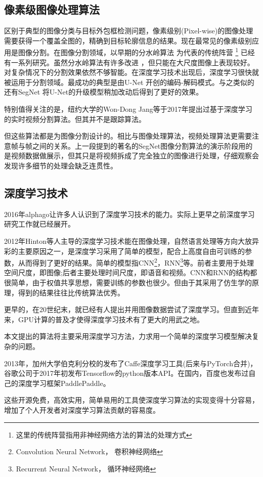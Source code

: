 \subsection{像素级图像处理算法}
区别于典型的图像分类与目标外包框检测问题，像素级别(Pixel-wise)的图像处理需要获得一个覆盖全图的，精确到目标轮廓信息的结果。现在最常见的像素级别应用是图像分割。在图像分割领域，以早期的分水岭算法
\supercite{olsen1997multi}
为代表的传统阵营
\footnote{这里的传统阵营指用非神经网络方法的算法的处理方式}
已经有一系列研究。虽然分水岭算法有许多改进
\supercite{grau2004improved}
，但只能在大尺度图像上表现较好。对复杂情况下的分割效果依然不够智能。在深度学习技术出现后，深度学习很快就被运用于分割领域。最成功的典型是由U-Net
\supercite{ronneberger2015u}
开创的编码-解码模式。与之类似的还有SegNet
\supercite{badrinarayanan2017segnet}
将U-Net的升级模型稍加改动后得到了更好的效果。
\par
特别值得关注的是，纽约大学的Won-Dong Jang等于2017年提出过基于深度学习的实时视频分割算法\supercite{jang2017online}。但其并不是跟踪算法。
\par
但这些算法都是为图像分割设计的。相比与图像处理算法，视频处理算法更需要注意帧与帧之间的关系。上一段提到的著名的SegNet图像分割算法的演示阶段用的是视频数据做展示，但其只是将视频拆成了完全独立的图像进行处理，仔细观察会发现许多细节的处理会缺乏连贯性。

\subsection{深度学习技术}
2016年alphago\supercite{wang2016does}让许多人认识到了深度学习技术的能力。实际上更早之前深度学习研究工作就已经展开。
\par
2012年Hinton等人主导的深度学习技术能在图像处理，自然语言处理等方向大放异彩的主要原因之一，是深度学习采用了简单的模型，配合上高度自由可训练的参数，从而得到了更好的结果。简单的模型指CNN\footnote{Convolution Neural Network， 卷积神经网络}，RNN\footnote{Recurrent Neural Network， 循环神经网络}等。前者主要用于处理空间尺度，即图像;后者主要处理时间尺度，即语音和视频。CNN和RNN的结构都很简单，由于权值共享思想，需要训练的参数也很少。但由于其采用了仿生学的原理，得到的结果往往比传统算法优秀。
\par
更早的，在20世纪末，就已经有人提出并用图像数据尝试了深度学习\supercite{lecun1998gradient}。但直到近年来，GPU计算的普及才使得深度学习技术有了更大的用武之地。
\par
本文提出的算法将主要采用深度学习方法，力求用一个简单的深度学习模型解决复杂的问题。

\par
2013年，加州大学伯克利分校的发布了Caffe\supercite{jia2014caffe}深度学习工具(后来与PyTorch\supercite{paszke2017automatic}合并)，谷歌公司于2017年初发布Tensorflow\supercite{abadi2016tensorflow}的python版本API。在国内，百度也发布过自己的深度学习框架PaddlePaddle\supercite{recognize_digits_paddle}。
\par
这些开源免费，高效实用，简单易用的工具使深度学习算法的实现变得十分容易，增加了个人开发者对深度学习算法贡献的容易度。

